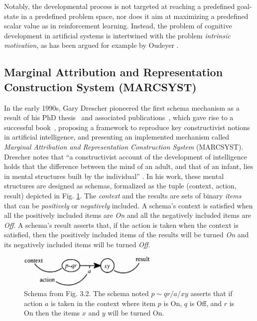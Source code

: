 \documentclass[runningheads]{llncs}
\begin{document}
Notably, the developmental process is not targeted at reaching a predefined goal-state in a predefined problem space, nor does it aim at maximizing a predefined scalar value as in reinforcement learning.
Instead, the problem of cognitive development in artificial systems is intertwined with the problem \textit{intrinsic motivation}, as has been argued for example by  
Oudeyer \cite{oudeyer_intrinsic_2007}. 


\subsection{Marginal Attribution and Representation Construction System (MARCSYST)}

In the early 1990s, Gary Drescher pioneered the first schema mechanism as a result of his PhD thesis~\cite{Drescher:1989} and associated publications~\cite{Drescher:1987,Drescher:1993}, which gave rise to a successful book~\cite{drescher_made-up_1991}, proposing a framework to reproduce key constructivist notions in artificial intelligence, and presenting an implemented mechanism called \textit{Marginal Attribution and Representation Construction System} (MARCSYST).
Drescher notes that ``a constructivist account of the development of intelligence holds that the difference between the mind of an adult, and that of an infant, lies in mental structures built by the individual'' \cite[p. 41]{drescher_made-up_1991}.
In his work, these mental structures are designed as schemas, formalized as the tuple (context, action, result) depicted in Fig. \ref{fig:drescher}.
The \textit{context} and the results are sets of binary \textit{items} that can be \textit{positively} or \textit{negatively} included. 
A schema's context is satisfied when all the positively included items are \textit{On} and all the negatively included items are \textit{Off}. 
A schema's result asserts that, if the action is taken when the context is satisfied, then the positively included items of the results will be turned \textit{On} and its negatively included items will be turned \textit{Off}.

%
\begin{figure}
	\centering
	\includegraphics[width=0.6\textwidth]{Figure_2_schema_drescher.png}
	\caption{Schema from \cite{drescher_made-up_1991} Fig. 3.2.
		The schema noted $p \!\sim\! qr/a/xy$ asserts that if action $a$ is taken in the context where item $p$ is On, $q$ is Off, and $r$ is On then the items $x$ and $y$ will be turned On.} 
	\label{fig:drescher}
\end{figure}
\end{document}
